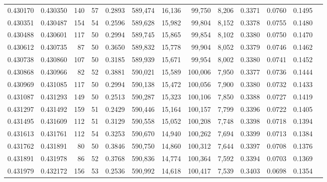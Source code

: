 \begin{tabular}{rrrrrrrrrrrrr}
0.430170 & 0.430350 &   140 &  57 &                                     0.2893 & 589,474 &  16,136 &  99,750 &   8,206 & 0.3371 & 0.0760 & 0.1495 \\
0.430351 & 0.430487 &   154 &  54 &                                     0.2596 & 589,628 &  15,982 &  99,804 &   8,152 & 0.3378 & 0.0755 & 0.1480 \\
0.430488 & 0.430601 &   117 &  50 &                                     0.2994 & 589,745 &  15,865 &  99,854 &   8,102 & 0.3380 & 0.0750 & 0.1470 \\
0.430612 & 0.430735 &    87 &  50 &                                     0.3650 & 589,832 &  15,778 &  99,904 &   8,052 & 0.3379 & 0.0746 & 0.1462 \\
0.430738 & 0.430860 &   107 &  50 &                                     0.3185 & 589,939 &  15,671 &  99,954 &   8,002 & 0.3380 & 0.0741 & 0.1452 \\
0.430868 & 0.430966 &    82 &  52 &                                     0.3881 & 590,021 &  15,589 & 100,006 &   7,950 & 0.3377 & 0.0736 & 0.1444 \\
0.430969 & 0.431085 &   117 &  50 &                                     0.2994 & 590,138 &  15,472 & 100,056 &   7,900 & 0.3380 & 0.0732 & 0.1433 \\
0.431087 & 0.431293 &   149 &  50 &                                     0.2513 & 590,287 &  15,323 & 100,106 &   7,850 & 0.3388 & 0.0727 & 0.1419 \\
0.431297 & 0.431492 &   159 &  51 &                                     0.2429 & 590,446 &  15,164 & 100,157 &   7,799 & 0.3396 & 0.0722 & 0.1405 \\
0.431495 & 0.431609 &   112 &  51 &                                     0.3129 & 590,558 &  15,052 & 100,208 &   7,748 & 0.3398 & 0.0718 & 0.1394 \\
0.431613 & 0.431761 &   112 &  54 &                                     0.3253 & 590,670 &  14,940 & 100,262 &   7,694 & 0.3399 & 0.0713 & 0.1384 \\
0.431762 & 0.431891 &    80 &  50 &                                     0.3846 & 590,750 &  14,860 & 100,312 &   7,644 & 0.3397 & 0.0708 & 0.1376 \\
0.431891 & 0.431978 &    86 &  52 &                                     0.3768 & 590,836 &  14,774 & 100,364 &   7,592 & 0.3394 & 0.0703 & 0.1369 \\
0.431979 & 0.432172 &   156 &  53 &                                     0.2536 & 590,992 &  14,618 & 100,417 &   7,539 & 0.3403 & 0.0698 & 0.1354 \\

\end{tabular}
